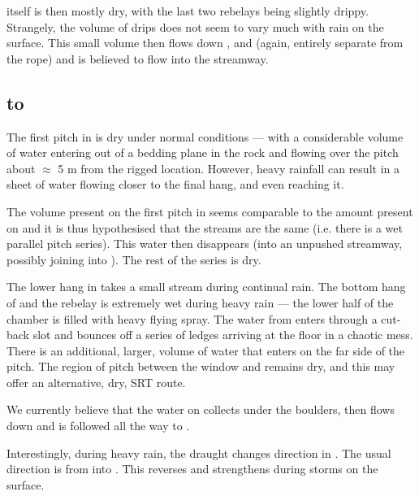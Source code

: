  itself is then mostly dry, with the last two rebelays being
slightly drippy. Strangely, the volume of drips does not seem to vary
much with rain on the surface. This small volume then flows 
down ,  and  (again, entirely separate
from the rope) and is believed to flow into the  streamway.

\subsection{ to }

The first pitch in  is dry under normal conditions --- with a considerable
volume of water entering out of a bedding plane in the rock and flowing over
the pitch about $\approx$ 5 m from the rigged location. However, heavy
rainfall can result in a sheet of water flowing closer to the final hang, and
even reaching it. 

The volume present on the first pitch in  seems comparable to the amount
present on  and it is thus hypothesised that the streams are the
same (i.e. there is a wet parallel pitch series). This water then disappears
(into an unpushed streamway, possibly joining into ). The rest of the
 series is dry.

The lower hang in  takes a small stream during continual rain. The
bottom hang of  and the rebelay is extremely wet during heavy rain
--- the lower half of the chamber is filled with heavy
flying spray. The water from  enters through a cut-back slot and bounces
off a series of ledges arriving at the floor in a chaotic mess. 
There is an additional, larger, volume of water that enters on the far side of
the  pitch. The region of  pitch between the  window and 
remains dry, and this may offer an alternative, dry, SRT route. 

We currently believe that the water on  collects under the boulders, then
flows down  and is followed all the way to .

Interestingly, during heavy rain, the draught changes direction in
. The usual direction is from  into .
This reverses and strengthens during storms on the surface.

